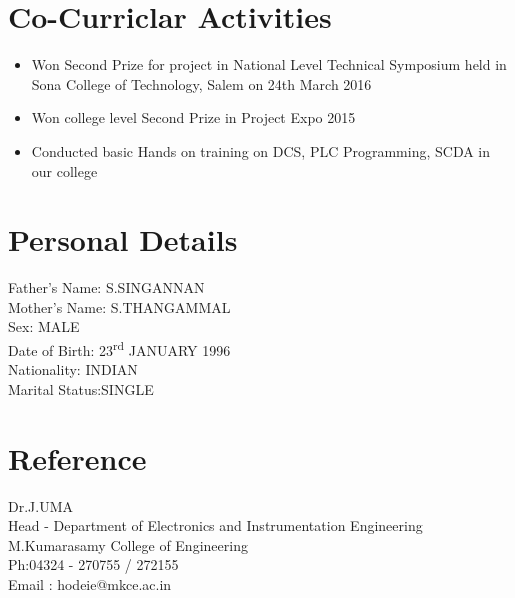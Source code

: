 \documentclass{My_CV_Class}
\begin{document}
\section{Co-Curriclar Activities}
\begin{itemize}
	\item Won Second Prize for project in National Level Technical Symposium held in Sona College of Technology, Salem on 24th March 2016
	\item Won college level Second Prize in Project Expo 2015
	\item Conducted basic Hands on training on DCS, PLC Programming, SCDA in our college
\end{itemize}
\section{Personal Details}
Father's Name: S.SINGANNAN \\
Mother's Name: S.THANGAMMAL\\
Sex:		   MALE\\
Date of Birth: 23\textsuperscript{rd} JANUARY 1996\\
Nationality:   INDIAN\\
Marital Status:SINGLE
\section{Reference}
Dr.J.UMA\\
Head - Department of Electronics and Instrumentation Engineering\\
M.Kumarasamy College of Engineering\\
Ph:04324 - 270755 / 272155\\
Email : hodeie@mkce.ac.in
\end{document}
